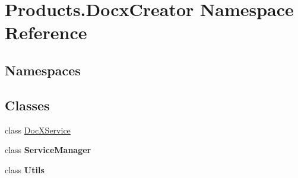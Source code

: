 \hypertarget{namespace_products_1_1_docx_creator}{}\section{Products.\+Docx\+Creator Namespace Reference}
\label{namespace_products_1_1_docx_creator}
\subsection*{Namespaces}
\begin{DoxyCompactItemize}
\end{DoxyCompactItemize}
\subsection*{Classes}
\begin{DoxyCompactItemize}
\item 
class \hyperlink{class_products_1_1_docx_creator_1_1_doc_x_service}{Doc\+X\+Service}
\item 
class {\bfseries Service\+Manager}
\item 
class {\bfseries Utils}
\end{DoxyCompactItemize}
